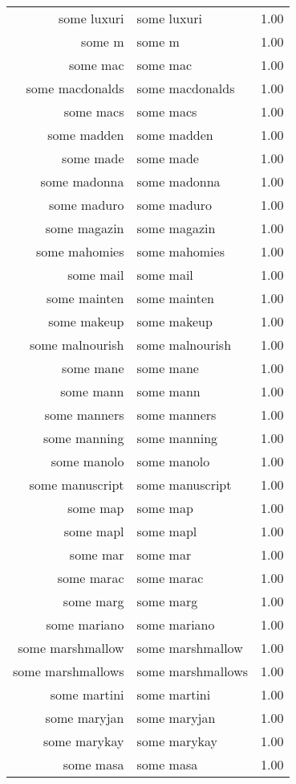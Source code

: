 \begin{table}[ht]
\begin{tabular}{rlr}
  some luxuri & some luxuri & 1.00 \\ 
  some m & some m & 1.00 \\ 
  some mac & some mac & 1.00 \\ 
  some macdonalds & some macdonalds & 1.00 \\ 
  some macs & some macs & 1.00 \\ 
  some madden & some madden & 1.00 \\ 
  some made & some made & 1.00 \\ 
  some madonna & some madonna & 1.00 \\ 
  some maduro & some maduro & 1.00 \\ 
  some magazin & some magazin & 1.00 \\ 
  some mahomies & some mahomies & 1.00 \\ 
  some mail & some mail & 1.00 \\ 
  some mainten & some mainten & 1.00 \\ 
  some makeup & some makeup & 1.00 \\ 
  some malnourish & some malnourish & 1.00 \\ 
  some mane & some mane & 1.00 \\ 
  some mann & some mann & 1.00 \\ 
  some manners & some manners & 1.00 \\ 
  some manning & some manning & 1.00 \\ 
  some manolo & some manolo & 1.00 \\ 
  some manuscript & some manuscript & 1.00 \\ 
  some map & some map & 1.00 \\ 
  some mapl & some mapl & 1.00 \\ 
  some mar & some mar & 1.00 \\ 
  some marac & some marac & 1.00 \\ 
  some marg & some marg & 1.00 \\ 
  some mariano & some mariano & 1.00 \\ 
  some marshmallow & some marshmallow & 1.00 \\ 
  some marshmallows & some marshmallows & 1.00 \\ 
  some martini & some martini & 1.00 \\ 
  some maryjan & some maryjan & 1.00 \\ 
  some marykay & some marykay & 1.00 \\ 
  some masa & some masa & 1.00 \\ 

\end{tabular}
\end{table}
